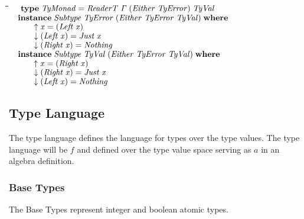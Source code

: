 \documentclass[10pt]{article}
\newlength{\lwidth}\setlength{\lwidth}{4.5cm}
\newlength{\cwidth}\setlength{\cwidth}{8mm} %
\newcommand{\Conid}[1]{\mathit{#1}}
\newcommand{\Varid}[1]{\mathit{#1}}
\begin{document}
\begin{tabbing}
\qquad\=\hspace{\lwidth}\=\hspace{\cwidth}\=\+\kill
${\hskip1.00em\relax\mathbf{type}\;\Conid{TyMonad}\mathrel{=}\Conid{ReaderT}\;\Varid{\Gamma}\;(\Conid{Either}\;\Conid{TyError})\;\Conid{TyVal}}$\\
${}$\\
${\hskip1.00em\relax\mathbf{instance}\;\Conid{Subtype}\;\Conid{TyError}\;(\Conid{Either}\;\Conid{TyError}\;\Conid{TyVal})\;\mathbf{where}}$\\
${\hskip1.00em\relax\hskip2.00em\relax\Varid{\uparrow}\;\Varid{x}\mathrel{=}(\Conid{Left}\;\Varid{x})}$\\
${\hskip1.00em\relax\hskip2.00em\relax\Varid{\downarrow}\;(\Conid{Left}\;\Varid{x})\mathrel{=}\Conid{Just}\;\Varid{x}}$\\
${\hskip1.00em\relax\hskip2.00em\relax\Varid{\downarrow}\;(\Conid{Right}\;\Varid{x})\mathrel{=}\Conid{Nothing}}$\\
${}$\\
${\hskip1.00em\relax\mathbf{instance}\;\Conid{Subtype}\;\Conid{TyVal}\;(\Conid{Either}\;\Conid{TyError}\;\Conid{TyVal})\;\mathbf{where}}$\\
${\hskip1.00em\relax\hskip2.00em\relax\Varid{\uparrow}\;\Varid{x}\mathrel{=}(\Conid{Right}\;\Varid{x})}$\\
${\hskip1.00em\relax\hskip2.00em\relax\Varid{\downarrow}\;(\Conid{Right}\;\Varid{x})\mathrel{=}\Conid{Just}\;\Varid{x}}$\\
${\hskip1.00em\relax\hskip2.00em\relax\Varid{\downarrow}\;(\Conid{Left}\;\Varid{x})\mathrel{=}\Conid{Nothing}}$
\end{tabbing}
\subsection{Type Language}

The type language defines the language for types over the type values.
The type language will be \ensuremath{\Varid{f}} and defined over the type value space
serving as \ensuremath{\Varid{a}} in an algebra definition.

\subsubsection{Base Types}

The Base Types represent integer and boolean atomic types.
\end{document}

